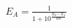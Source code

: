\documentclass[preview]{standalone}
\begin{document}
\begin{align*}
E_A = \frac{1}{1 + 10^{\frac{ R_B - R_A }{400}}}
\end{align*}
\end{document}
